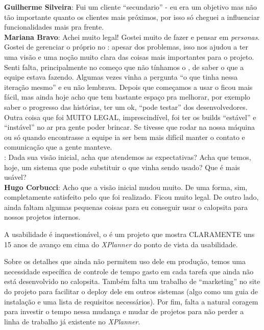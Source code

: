 \textbf{Guilherme Silveira}: Fui um cliente ``secundario'' - eu era um objetivo mas não tão importante quanto os clientes mais próximos, por isso só cheguei a influenciar funcionalidades mais pra frente. \\

\textbf{Mariana Bravo}: Achei muito legal!
Gostei muito de fazer e pensar em \textit{personas}. Gostei de gerenciar o próprio \calopsita{} no \calopsita{}: apesar dos problemas, isso nos ajudou a ter uma visão e uma noção muito clara das coisas mais importantes para o projeto.
Senti falta, principalmente no começo que não tínhamos o \calopsita{}, de saber o que a equipe estava fazendo. Algumas vezes vinha a pergunta ``o que tinha nessa iteração mesmo'' e eu não lembrava.
Depois que começamos a usar o \calopsita{} ficou mais fácil, mas ainda hoje acho que tem bastante espaço pra melhorar, por exemplo saber o progresso das histórias, ter um ok, ``pode testar'' dos desenvolvedores.
Outra coisa que foi MUITO LEGAL, imprescindível, foi ter os builds ``estável'' e ``instável'' no ar pra gente poder brincar. Se tivesse que rodar na nossa máquina ou só quando encontrasse a equipe ia ser bem mais difícil manter o contato e comunicação que a gente manteve. \\

\textbf{\calopsita{}}: Dada sua visão inicial, acha que atendemos as expectativas? Acha que temos, hoje, um sistema que pode substituir o que vinha sendo usado? Que é mais usável?\\

\textbf{Hugo Corbucci}: Acho que a visão inicial mudou muito. De uma forma, sim, completamente satisfeito pelo que foi realizado. Ficou muito legal. De outro lado, ainda faltam algumas pequenas coisas para eu conseguir usar o calopsita para nossos projetos internos.

A usabilidade é inquestionável, o \calopsita{} é um projeto que mostra CLARAMENTE uns 15 anos de avanço em cima do \textit{XPlanner} do ponto de vista da usabilidade.

Sobre os detalhes que ainda não permitem uso dele em produção, temos uma necessidade específica de controle de tempo gasto em cada tarefa que ainda não está desenvolvido no calopsita. Também falta um trabalho de ``marketing'' no site do projeto para facilitar o deploy dele em outros sistemas (algo como um guia de instalação e uma lista de requisitos necessários). Por fim, falta a natural coragem para investir o tempo nessa mudança e mudar de projetos para não perder a linha de trabalho já existente no \textit{XPlanner}.\\

